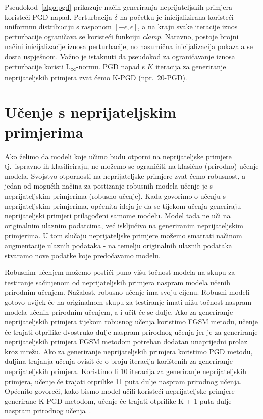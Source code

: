 \documentclass[times, utf8, zavrsni, numeric]{fer}
\begin{document}
\pagebreak

Pseudokod~\ref{algo:pgd} prikazuje način generiranja neprijateljskih primjera koristeći PGD napad. 
Perturbacija $\delta$ na početku je inicijalizirana koristeći uniformnu distribuciju s rasponom $[-\epsilon, \epsilon]$, 
a na kraju svake iteracije iznos perturbacije ograničava se koristeći funkciju \textit{clamp}. 
Naravno, postoje brojni načini inicijalizacije iznosa perturbacije, no nasumična inicijalizacija pokazala se dosta uspješnom.
Važno je istaknuti da pseudokod za ograničavanje iznosa perturbacije koristi L\textsubscript{$\infty$}-normu. 
PGD napad s $K$ iteracija za generiranje neprijateljskih primjera zvat ćemo K-PGD (npr.\ 20-PGD).

\section{Učenje s neprijateljskim primjerima}

Ako želimo da modeli koje učimo budu otporni na neprijateljske primjere tj.\ ispravno ih klasificiraju, ne možemo se ograničiti na klasično (prirodno) učenje modela.
Svojstvo otpornosti na neprijateljske primjere zvat ćemo robusnost, a jedan od mogućih načina za postizanje robusnih modela učenje je s neprijateljskim primjerima (robusno učenje).
Kada govorimo o učenju s neprijateljskim primjerima, općenita ideja je da se tijekom učenja generiraju neprijateljski primjeri prilagođeni samome modelu.
Model tada ne uči na originalnim ulaznim podatcima, već isključivo na generiranim neprijateljskim primjerima.
U tom slučaju neprijateljske primjere možemo smatrati načinom augmentacije ulaznih podataka - na temelju originalnih ulaznih podataka stvaramo nove podatke koje predočavamo modelu.

Robusnim učenjem možemo postići puno višu točnost modela na skupu za testiranje sačinjenom od neprijateljskih primjera naspram modela učenih prirodnim učenjem.
Nažalost, robusno učenje ima svoju cijenu. Robusni modeli gotovo uvijek će na originalnom skupu za testiranje imati nižu točnost naspram modela učenih prirodnim učenjem,
a i učit će se dulje. Ako za generiranje neprijateljskih primjera tijekom robusnog učenja koristimo FGSM metodu, učenje će trajati otprilike dvostruko dulje naspram prirodnog učenja
jer je za generiranje neprijateljskih primjera FGSM metodom potreban dodatan unaprijedni prolaz kroz mrežu. 
Ako za generiranje neprijateljskih primjera koristimo PGD metodu, duljina trajanja učenja ovisit će o broju iteracija korištenih za generiranje neprijateljskih primjera.
Koristimo li 10 iteracija za generiranje neprijateljskih primjera, učenje će trajati otprilike 11 puta dulje naspram prirodnog učenja. 
Općenito govoreći, kako bismo model učili koristeći neprijateljske primjere generirane K-PGD metodom, učenje će trajati otprilike K + 1 puta dulje naspram prirodnog učenja~\cite{shafahi2019adversarial}.
\end{document}
